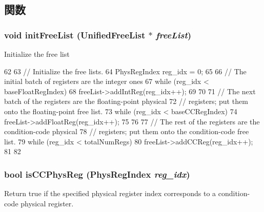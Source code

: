 \subsection{関数}
\hypertarget{classPhysRegFile_acbe3de868fb982a4e1cdcc18b7b70306}{
\subsubsection[{initFreeList}]{\setlength{\rightskip}{0pt plus 5cm}void initFreeList ({\bf UnifiedFreeList} $\ast$ {\em freeList})}}
\label{classPhysRegFile_acbe3de868fb982a4e1cdcc18b7b70306}
Initialize the free list 


\begin{DoxyCode}
62 {
63     // Initialize the free lists.
64     PhysRegIndex reg_idx = 0;
65 
66     // The initial batch of registers are the integer ones
67     while (reg_idx < baseFloatRegIndex) {
68         freeList->addIntReg(reg_idx++);
69     }
70 
71     // The next batch of the registers are the floating-point physical
72     // registers; put them onto the floating-point free list.
73     while (reg_idx < baseCCRegIndex) {
74         freeList->addFloatReg(reg_idx++);
75     }
76 
77     // The rest of the registers are the condition-code physical
78     // registers; put them onto the condition-code free list.
79     while (reg_idx < totalNumRegs) {
80         freeList->addCCReg(reg_idx++);
81     }
82 }
\end{DoxyCode}
\hypertarget{classPhysRegFile_a781ae6a1156bf528a33e2489664c1dd4}{
\subsubsection[{isCCPhysReg}]{\setlength{\rightskip}{0pt plus 5cm}bool isCCPhysReg ({\bf PhysRegIndex} {\em reg\_\-idx})}}
\label{classPhysRegFile_a781ae6a1156bf528a33e2489664c1dd4}
Return true if the specified physical register index corresponds to a condition-\/code physical register. 


